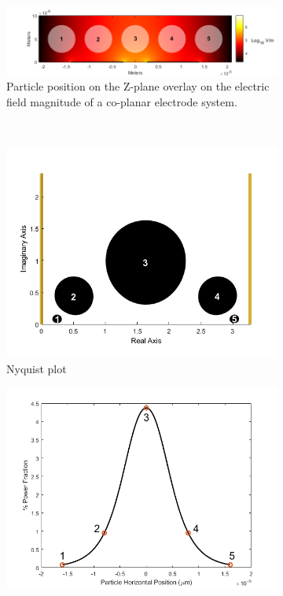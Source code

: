 \begin{figure}[h]
    \centering
    \begin{subfigure}[b]{\textwidth}
        \centering
        \includegraphics[width=\textwidth]{images/Particles_in_Z_Plane.png}
        \caption{Particle position on the Z-plane overlay on the electric field magnitude of a co-planar electrode system.}
    \end{subfigure}
    \\
    \vspace{0.1 in}
    \begin{subfigure}[b]{0.49\textwidth}
        \centering
        \includegraphics[width=\textwidth]{images/Particle_in_W_Plane.png}
        \caption{Nyquist plot}
    \end{subfigure}
    \hfill
    \begin{subfigure}[b]{0.49\textwidth}
        \centering
        \includegraphics[width=\textwidth]{images/HorizontalPowerFraction.png}

\end{subfigure}
\end{figure}
